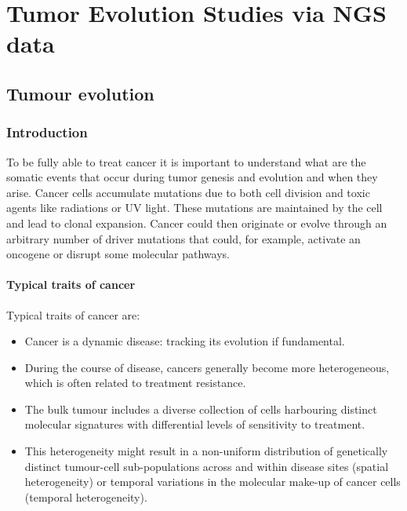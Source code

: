 \graphicspath{{chapters/notes/05/images}}
\chapter{Tumor Evolution Studies via NGS data}

\section{Tumour evolution}

	\subsection{Introduction}
	To be fully able to treat cancer it is important to understand what are the somatic events that occur during tumor genesis and evolution and when they arise.
	Cancer cells accumulate mutations due to both cell division and toxic agents like radiations or UV light.
	These mutations are maintained by the cell and lead to clonal expansion.
	Cancer could then originate or evolve through an arbitrary number of driver mutations that could, for example, activate an oncogene or disrupt some molecular pathways.

		\subsubsection{Typical traits of cancer}
		Typical traits of cancer are:

		\begin{multicols}{2}
			\begin{itemize}
				\item Cancer is a dynamic disease: tracking its evolution if fundamental.
				\item During the course of disease, cancers generally become more heterogeneous, which is often related to treatment resistance.
				\item The bulk tumour includes a diverse collection of cells harbouring distinct molecular signatures with differential levels of sensitivity to treatment.
				\item This heterogeneity might result in a non-uniform distribution of genetically distinct tumour-cell sub-populations across and within disease sites (spatial heterogeneity) or temporal variations in the molecular make-up of cancer cells (temporal heterogeneity).
			\end{itemize}
		\end{multicols}

